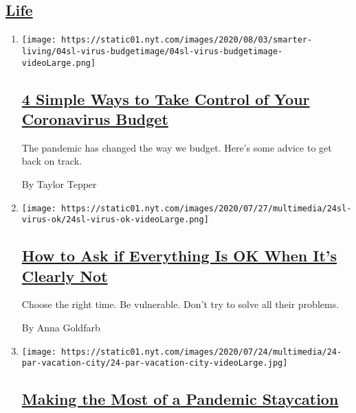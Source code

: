 \hypertarget{life}{%
\subsection{\texorpdfstring{\protect\hyperlink{}{Life}}{Life}}\label{life}}

\begin{enumerate}
\def\labelenumi{\arabic{enumi}.}
\item
  \texttt{[image: https://static01.nyt.com/images/2020/08/03/smarter-living/04sl-virus-budgetimage/04sl-virus-budgetimage-videoLarge.png]}

  \hypertarget{4-simple-ways-to-take-control-of-your-coronavirus-budget}{%
  \subsection{\texorpdfstring{\href{/2020/08/03/smarter-living/coronavirus-budget-save-money.html}{4
  Simple Ways to Take Control of Your Coronavirus
  Budget}}{4 Simple Ways to Take Control of Your Coronavirus Budget}}\label{4-simple-ways-to-take-control-of-your-coronavirus-budget}}

  The pandemic has changed the way we budget. Here's some advice to get
  back on track.

  By Taylor Tepper
\item
  \texttt{[image: https://static01.nyt.com/images/2020/07/27/multimedia/24sl-virus-ok/24sl-virus-ok-videoLarge.png]}

  \hypertarget{how-to-ask-if-everything-is-ok-when-its-clearly-not}{%
  \subsection{\texorpdfstring{\href{/2020/07/28/smarter-living/coronavirus-how-to-check-in-with-a-friend.html}{How
  to Ask if Everything Is OK When It's Clearly
  Not}}{How to Ask if Everything Is OK When It's Clearly Not}}\label{how-to-ask-if-everything-is-ok-when-its-clearly-not}}

  Choose the right time. Be vulnerable. Don't try to solve all their
  problems.

  By Anna Goldfarb
\item
  \texttt{[image: https://static01.nyt.com/images/2020/07/24/multimedia/24-par-vacation-city/24-par-vacation-city-videoLarge.jpg]}

  \hypertarget{making-the-most-of-a-pandemic-staycation}{%
  \subsection{\texorpdfstring{\href{/2020/07/24/parenting/summer-staycation-coronavirus.html}{Making
  the Most of a Pandemic
  Staycation}}{Making the Most of a Pandemic Staycation}}\label{making-the-most-of-a-pandemic-staycation}}


\end{enumerate}
